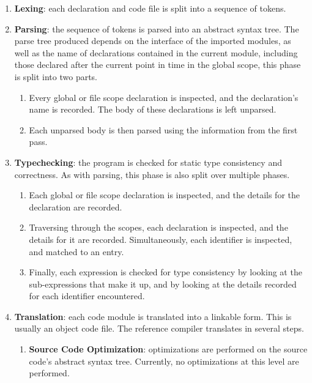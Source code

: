 \documentclass[letterpaper,12pt]{book}
\begin{document}
\begin{enumerate}
	\item \textbf{Lexing}: each declaration and code file is split into a sequence of tokens.

	\item \textbf{Parsing}: the sequence of tokens is parsed into an abstract syntax tree. The parse tree produced depends on the interface of the imported modules, as well as the name of declarations contained in the current module, including those declared after the current point in time in the global scope, this phase is split into two parts.
	\begin{enumerate}
		\item Every global or file scope declaration is inspected, and the declaration's name is recorded. The body of these declarations is left unparsed.
		
		\item Each unparsed body is then parsed using the information from the first pass.
	\end{enumerate}

	\item \textbf{Typechecking}: the program is checked for static type consistency and correctness. As with parsing, this phase is also split over multiple phases.
	\begin{enumerate}
		\item Each global or file scope declaration is inspected, and the details for the declaration are recorded.
		
		\item Traversing through the scopes, each declaration is inspected, and the details for it are recorded. Simultaneously, each identifier is inspected, and matched to an entry.
		
		\item Finally, each expression is checked for type consistency by looking at the sub-expressions that make it up, and by looking at the details recorded for each identifier encountered.
	\end{enumerate}
	
	\item \textbf{Translation}: each code module is translated into a linkable form. This is usually an object code file. The reference compiler translates in several steps.
	\begin{enumerate}
		\item \textbf{Source Code Optimization}: optimizations are performed on the source code's abstract syntax tree. Currently, no optimizations at this level are performed.
		

\end{enumerate}
\end{enumerate}
\end{document}
